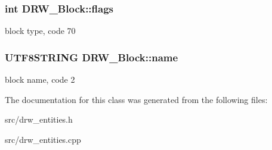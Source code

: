 \subsubsection[{flags}]{\setlength{\rightskip}{0pt plus 5cm}int D\+R\+W\+\_\+\+Block\+::flags}\label{class_d_r_w___block_a17bb4c01376f4b30b8d3ce36863b3ae3}
block type, code 70 \hypertarget{class_d_r_w___block_a574a37d634655f8ea5526a80e842a66a}{}
\subsubsection[{name}]{\setlength{\rightskip}{0pt plus 5cm}U\+T\+F8\+S\+T\+R\+I\+N\+G D\+R\+W\+\_\+\+Block\+::name}\label{class_d_r_w___block_a574a37d634655f8ea5526a80e842a66a}
block name, code 2 

The documentation for this class was generated from the following files\+:\begin{DoxyCompactItemize}
\item 
src/drw\+\_\+entities.\+h\item 
src/drw\+\_\+entities.\+cpp\end{DoxyCompactItemize}
